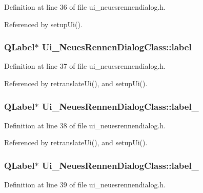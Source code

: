 Definition at line 36 of file ui\_\-neuesrennendialog.h.

Referenced by setupUi().\hypertarget{class_ui___neues_rennen_dialog_class_4d27822f812528d8321a91abe9c25250}{
\subsubsection[label]{\setlength{\rightskip}{0pt plus 5cm}QLabel$\ast$ {\bf Ui\_\-NeuesRennenDialogClass::label}}}
\label{class_ui___neues_rennen_dialog_class_4d27822f812528d8321a91abe9c25250}




Definition at line 37 of file ui\_\-neuesrennendialog.h.

Referenced by retranslateUi(), and setupUi().\hypertarget{class_ui___neues_rennen_dialog_class_f0a87dcf37a3df895a558c395862fc4a}{
\subsubsection[label\_\-2]{\setlength{\rightskip}{0pt plus 5cm}QLabel$\ast$ {\bf Ui\_\-NeuesRennenDialogClass::label\_}}}
\label{class_ui___neues_rennen_dialog_class_f0a87dcf37a3df895a558c395862fc4a}




Definition at line 38 of file ui\_\-neuesrennendialog.h.

Referenced by retranslateUi(), and setupUi().\hypertarget{class_ui___neues_rennen_dialog_class_6307719ca998b622dee621144d1f4a8a}{
\subsubsection[label\_\-3]{\setlength{\rightskip}{0pt plus 5cm}QLabel$\ast$ {\bf Ui\_\-NeuesRennenDialogClass::label\_}}}
\label{class_ui___neues_rennen_dialog_class_6307719ca998b622dee621144d1f4a8a}




Definition at line 39 of file ui\_\-neuesrennendialog.h.

